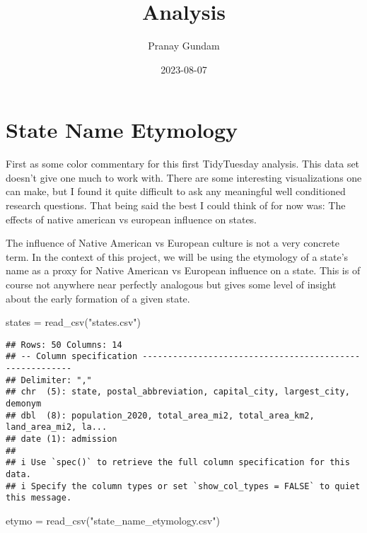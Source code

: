 \documentclass[
]{article}
\title{Analysis}
\author{Pranay Gundam}
\date{2023-08-07}
\newenvironment{Shaded}{\begin{snugshade}}{\end{snugshade}}
\newcommand{\FunctionTok}[1]{\textcolor[rgb]{0.00,0.00,0.00}{#1}}
\newcommand{\NormalTok}[1]{#1}
\newcommand{\OtherTok}[1]{\textcolor[rgb]{0.56,0.35,0.01}{#1}}
\newcommand{\StringTok}[1]{\textcolor[rgb]{0.31,0.60,0.02}{#1}}
\begin{document}
\maketitle

\hypertarget{state-name-etymology}{%
\section{State Name Etymology}\label{state-name-etymology}}

First as some color commentary for this first TidyTuesday analysis. This
data set doesn't give one much to work with. There are some interesting
visualizations one can make, but I found it quite difficult to ask any
meaningful well conditioned research questions. That being said the best
I could think of for now was: The effects of native american vs european
influence on states.

The influence of Native American vs European culture is not a very
concrete term. In the context of this project, we will be using the
etymology of a state's name as a proxy for Native American vs European
influence on a state. This is of course not anywhere near perfectly
analogous but gives some level of insight about the early formation of a
given state.

\begin{Shaded}
\begin{Highlighting}[]
\NormalTok{states }\OtherTok{=} \FunctionTok{read\_csv}\NormalTok{(}\StringTok{"states.csv"}\NormalTok{)}
\end{Highlighting}
\end{Shaded}

\begin{verbatim}
## Rows: 50 Columns: 14
## -- Column specification --------------------------------------------------------
## Delimiter: ","
## chr  (5): state, postal_abbreviation, capital_city, largest_city, demonym
## dbl  (8): population_2020, total_area_mi2, total_area_km2, land_area_mi2, la...
## date (1): admission
## 
## i Use `spec()` to retrieve the full column specification for this data.
## i Specify the column types or set `show_col_types = FALSE` to quiet this message.
\end{verbatim}

\begin{Shaded}
\begin{Highlighting}[]
\NormalTok{etymo }\OtherTok{=} \FunctionTok{read\_csv}\NormalTok{(}\StringTok{"state\_name\_etymology.csv"}\NormalTok{)}
\end{Highlighting}
\end{Shaded}
\end{document}
